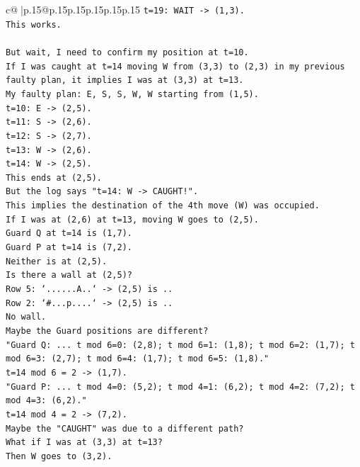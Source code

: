 \documentclass{article}
\begin{document}
{\begin{supertabular}{c@{$\;$}|p{.15\linewidth}@{}p{.15\linewidth}p{.15\linewidth}p{.15\linewidth}p{.15\linewidth}p{.15\linewidth}}
{{{\texttt{t=19: WAIT {-}> (1,3).} \\
\texttt{This works.} \\
\\ 
\texttt{But wait, I need to confirm my position at t=10.} \\
\texttt{If I was caught at t=14 moving W from (3,3) to (2,3) in my previous faulty plan, it implies I was at (3,3) at t=13.} \\
\texttt{My faulty plan: E, S, S, W, W starting from (1,5).} \\
\texttt{t=10: E {-}> (2,5).} \\
\texttt{t=11: S {-}> (2,6).} \\
\texttt{t=12: S {-}> (2,7).} \\
\texttt{t=13: W {-}> (2,6).} \\
\texttt{t=14: W {-}> (2,5).} \\
\texttt{This ends at (2,5).} \\
\texttt{But the log says "t=14: W {-}> CAUGHT!".} \\
\texttt{This implies the destination of the 4th move (W) was occupied.} \\
\texttt{If I was at (2,6) at t=13, moving W goes to (2,5).} \\
\texttt{Guard Q at t=14 is (1,7).} \\
\texttt{Guard P at t=14 is (7,2).} \\
\texttt{Neither is at (2,5).} \\
\texttt{Is there a wall at (2,5)?} \\
\texttt{Row 5: `......A..` {-}> (2,5) is ..} \\
\texttt{Row 2: `\#...p....` {-}> (2,5) is ..} \\
\texttt{No wall.} \\
\texttt{Maybe the Guard positions are different?} \\
\texttt{"Guard Q: ... t mod 6=0: (2,8); t mod 6=1: (1,8); t mod 6=2: (1,7); t mod 6=3: (2,7); t mod 6=4: (1,7); t mod 6=5: (1,8)."} \\
\texttt{t=14 mod 6 = 2 {-}> (1,7).} \\
\texttt{"Guard P: ... t mod 4=0: (5,2); t mod 4=1: (6,2); t mod 4=2: (7,2); t mod 4=3: (6,2)."} \\
\texttt{t=14 mod 4 = 2 {-}> (7,2).} \\
\texttt{Maybe the "CAUGHT" was due to a different path?} \\
\texttt{What if I was at (3,3) at t=13?} \\
\texttt{Then W goes to (3,2).} \\
}}}
\end{supertabular}}
\end{document}
